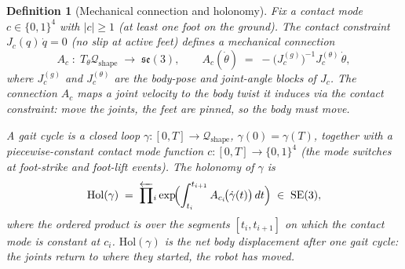 \documentclass[11pt,a4paper]{article}
\newtheorem{definition}[theorem]{Definition}
\begin{document}
\begin{definition}[Mechanical connection and holonomy]
\label{def:holonomy-locomotion}
Fix a contact mode $c \in \{0,1\}^4$
with $|c| \geq 1$ (at least one foot on the ground).
The contact constraint
$J_c(q)\,\dot{q} = 0$
(no slip at active feet)
defines a \emph{mechanical connection}
\begin{equation}\label{eq:mech-connection}
  A_c \;:\; T_\theta \mathcal{Q}_{\mathrm{shape}}
  \;\longrightarrow\;
  \mathfrak{se}(3),
  \qquad
  A_c(\dot\theta)
  \;=\;
  -\bigl(J_c^{(g)}\bigr)^{-1}
   J_c^{(\theta)}\,\dot\theta,
\end{equation}
where $J_c^{(g)}$ and $J_c^{(\theta)}$ are the
body-pose and joint-angle blocks of $J_c$.
The connection $A_c$ maps a joint velocity
to the body twist it induces
via the contact constraint:
move the joints, the feet are pinned,
so the body must move.

\medskip\noindent
A \emph{gait cycle} is a closed loop
$\gamma : [0, T] \to \mathcal{Q}_{\mathrm{shape}}$,
$\gamma(0) = \gamma(T)$,
together with a piecewise-constant
contact mode function
$c : [0, T] \to \{0,1\}^4$
(the mode switches at foot-strike and foot-lift events).
The \emph{holonomy} of $\gamma$ is
\begin{equation}\label{eq:holonomy}
  \mathrm{Hol}(\gamma)
  \;=\;
  \overleftarrow{\prod}_{i}
  \exp\!\Bigl(
    \int_{t_i}^{t_{i+1}}
    A_{c_i}\!\bigl(\dot\gamma(t)\bigr)\,dt
  \Bigr)
  \;\in\; \mathrm{SE}(3),
\end{equation}
where the ordered product is over the segments
$[t_i, t_{i+1}]$ on which the contact mode
is constant at $c_i$.
$\mathrm{Hol}(\gamma)$ is the net body displacement
after one gait cycle:
the joints return to where they started,
the robot has moved.
\end{definition}
\end{document}
